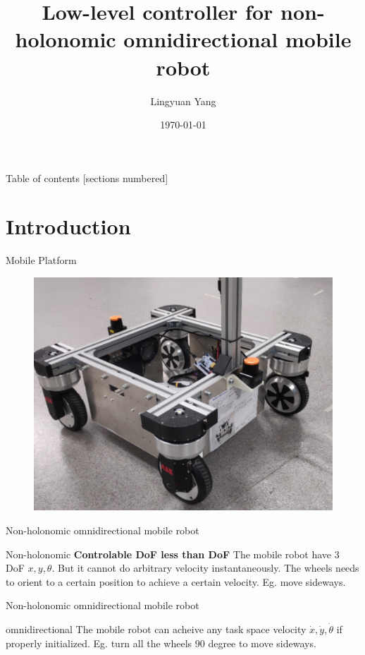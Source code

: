 \documentclass[10pt]{beamer}
\title{Low-level controller for non-holonomic omnidirectional mobile robot}
\date{\today}
\author{Lingyuan Yang}
\institute{Technische Universität Berlin\\ABB Corporate Research}
\begin{document}
\maketitle

\begin{frame}{Table of contents}
  [sections numbered]
  \tableofcontents[hideallsubsections]
\end{frame}

\section{Introduction}
\begin{frame}{Mobile Platform}
    \begin{figure}
        \centering
        \includegraphics[width=\textwidth]{Figure/mobilePlatform.jpg}
        \caption{}
        \label{fig:mobilePlatform}
    \end{figure}
\end{frame}
\begin{frame}{Non-holonomic omnidirectional mobile robot}
    	\begin{alertblock}{Non-holonomic}
		\textbf{Controlable DoF less than DoF} The mobile robot have 3 DoF $x,y,\theta$. But it cannot do arbitrary velocity instantaneously. The wheels needs to orient to a certain position to achieve a certain velocity. Eg. move sideways.
	\end{alertblock}
\end{frame}
\begin{frame}{Non-holonomic omnidirectional mobile robot}
    	\begin{alertblock}{omnidirectional}
		The mobile robot can acheive any task space velocity $\dot{x},\dot{y},\dot{\theta}$ if properly initialized.
		Eg. turn all the wheels 90 degree to move sideways.
	\end{alertblock}
\end{frame}
\end{document}
